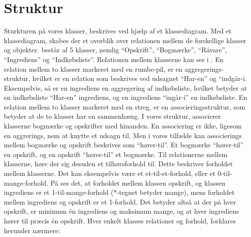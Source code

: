 \section{Struktur}
\label{sec:struktur}

Sturkturen på vores klasser, beskrives ved hjælp af et klassediagram. Med et klassediagram, skabes der et overblik over relationen mellem de forskellige klasser og objekter. \foodl består af 5 klasser, nemlig ``Opskrift'', ``Bogmærke'', ``Råvare'', ``Ingrediens'' og ``Indkøbsliste''. Relationen mellem klasserne kan ses i . En relation mellem to klasser markeret med en rumbe-pil, er en aggregerings-struktur, hvilket er en relation som beskrives ved udsagnet ``Har-en'' og ``indgår-i. Eksempelvis, så er en ingrediens en aggregering af indkøbsliste, hvilket betyder at en indkøbsliste ``Har-en'' ingrediens, og en ingrediens ``ingår-i'' en indkøbsliste. En relation mellem to klasser markeret med en streg, er en associeringsstruktur, som betyder at de to klasser har en sammenhæng. I vores struktur, associerer klasserne bogmærke og opskrifter med hinanden. En associering er ikke, ligesom en aggrerings, nem at knytte et udsagn til. Men i vores tilfælde kan associerings mellem bogmærke og opskrift beskrives som ``hører-til''. Et bogmærke ``hører-til'' en opskrift, og en opskrift ``hører-til'' et bogmærke. Til relationerne mellem klasserne, høre der sig desuden et tilhørsforhold til. Dette beskriver forholdet mellem klasserne. Det kan eksempelvis være et et-til-et-forhold, eller et 0-til-mange-forhold. På  ses det, at forholdet mellem klassen opskrift, og klassen ingrediens er et 1-til-mange-forhold (*-tegnet betyder mange), mens forholdet mellem ingrediens og opskrift er et 1-forhold. Det betyder altså at der på hver opskrift, er minimum én ingrediens og maksimum mange, og at hver ingrediens hører til præcis én opskrift. Hver enkelt klasses relationer og forhold, forklares herunder nærmere:



